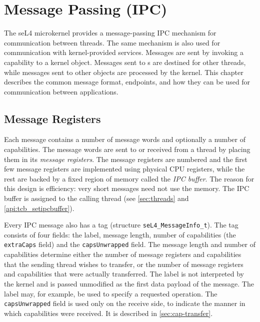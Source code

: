 %
%
%
%

\chapter{\label{ch:ipc}Message Passing (IPC)}

The seL4 microkernel provides a message-passing IPC mechanism for communication
between threads. The same mechanism is also used for communication with
kernel-provided services. Messages are sent by invoking a capability to a
kernel object. Messages sent to s are destined for other
threads, while messages sent to other objects are processed by the kernel. This
chapter describes the common message format, endpoints,
and how they can be used for communication between applications.

\section{Message Registers}
\label{sec:messageinfo}

Each message contains a number of message words and optionally a number of
capabilities.
The message words are sent to or received from a thread by placing them in its \emph{message registers}.
The message registers are numbered and the first few message registers are implemented
using physical CPU registers, while the rest are backed by a fixed region of
memory called the \emph{IPC buffer}.
The reason for this design is efficiency:
very short messages need not use the memory.
The IPC buffer is assigned to the calling thread (see \autoref{sec:threads} and \autoref{api:tcb_setipcbuffer}).

Every IPC message also has a tag (structure \texttt{seL4\_MessageInfo\_t}).  The
tag consists of four fields: the label, message length, number of capabilities
(the \texttt{extraCaps} field) and the \texttt{capsUnwrapped} field.  The
message length and number of capabilities determine either the number of
message registers and capabilities that the sending thread wishes to transfer,
or the number of message registers and capabilities that were actually
transferred. The label is not interpreted by the
kernel and is passed unmodified as the first data payload of the message. The
label may, for example, be used to specify a requested operation. The
\texttt{capsUnwrapped} field is used only on the receive side, to indicate the
manner in which capabilities were received. It is described in
\autoref{sec:cap-transfer}.

